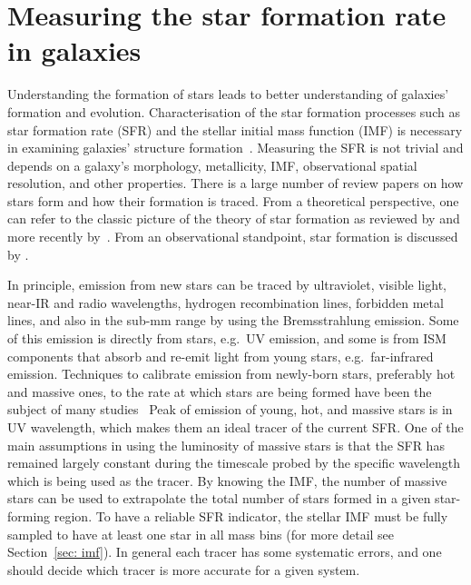 \section{Measuring the star formation rate in galaxies} 
\label{sec: sfr_intro}
Understanding the formation of stars leads to better understanding of galaxies' formation and evolution. 
Characterisation of the star formation processes such as star formation rate (SFR) and the stellar initial mass function (IMF) is necessary in examining galaxies' structure formation~\citep{McKee07}. 
Measuring the SFR is not trivial and depends on a galaxy's morphology, metallicity, IMF, observational spatial resolution, and other properties. 
There is a large number of review papers on how stars form and how their formation is traced. 
From a theoretical perspective, one can refer to the classic picture of the theory of star formation as reviewed by \cite{Shu87} and more recently by~\citep{McKee07}. 
From an observational standpoint, star formation is discussed by \cite[][and references therein]{Kennicutt98b, Kewley02, Calzetti13, Boquien10, Kennicutt12}.

In principle, emission from new stars can be traced by ultraviolet, visible light, near-IR and radio wavelengths, hydrogen recombination lines, forbidden metal lines, and also in the sub-mm range by using the Bremsstrahlung emission. 
Some of this emission is directly from stars, e.g.\ UV emission, and some is from ISM components that absorb and re-emit light from young stars, e.g.\ far-infrared emission.
Techniques to calibrate emission from newly-born stars, preferably hot and massive ones, to the rate at which stars are being formed have been the subject of many studies~\citep[e.g.][]{Calzetti07, Kennicutt11, Hao11,Bigiel08} 
Peak of emission of young, hot, and massive stars is in UV wavelength, which makes them an ideal tracer of the current SFR.
One of the main assumptions in using the luminosity of massive stars is that the SFR has remained largely constant during the timescale probed by the specific wavelength which is being used as the tracer. 
By knowing the IMF, the number of massive stars can be used to extrapolate the total number of stars formed in a given star-forming region.
To have a reliable SFR indicator, the stellar IMF must be fully sampled to have at least one star in all mass bins (for more detail see Section~\ref{sec: imf}).
In general each tracer has some systematic errors, and one should decide which tracer is more accurate for a given system. 

